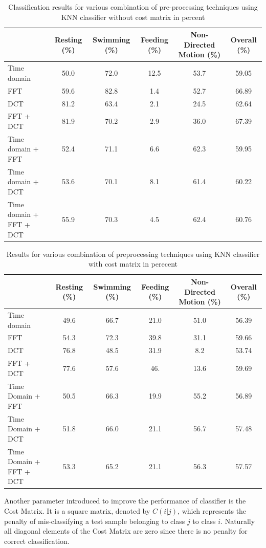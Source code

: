 \documentclass[conference]{IEEEtran}
\begin{document}
\begin{table}[h]
	\centering
	\caption{Classification results for various combination of pre-processing techniques using KNN classifier without cost matrix in percent}
	\begin{tabular}{l c c c c c}
	\hline
	& \textbf{Resting} (\%) & \textbf{Swimming}  (\%) & \textbf{Feeding}  (\%) & \textbf{Non-Directed Motion}  (\%) & \textbf{Overall}  (\%) \\
	\hline
	Time domain & 50.0&	72.0&	12.5&	53.7&	59.05\\
     FFT & 59.6&	82.8&	1.4&	52.7&	66.89\\
     DCT & 81.2&	63.4&	2.1&	24.5&	62.64 \\
   FFT + DCT & 81.9&	70.2&	2.9&	36.0& 	67.39\\
	Time domain + FFT & 52.4& 	71.1&	6.6&	62.3&	59.95 \\
	Time domain + DCT & 53.6& 	70.1&	8.1&	61.4&	60.22\\
	Time domain + FFT + DCT & 55.9&	70.3&	4.5&	62.4&	60.76 \\
	\hline
	\end{tabular}
	\label{without cost matrix}
\end{table}

\begin{table}[h]
	\centering
	\caption{Results for various combination of preprocessing techniques using KNN classifier with cost matrix in perecent}
	\begin{tabular}{l c c c c c}
	\hline
	& \textbf{Resting} (\%) & \textbf{Swimming}  (\%) & \textbf{Feeding}  (\%) & \textbf{Non-Directed Motion}  (\%) & \textbf{Overall}  (\%) \\
	\hline
	Time domain & 49.6	&66.7&	21.0&	51.0&	56.39\\
     FFT & 54.3&	72.3&	39.8&	31.1&	59.66\\
     DCT & 76.8&	48.5&	31.9&	8.2&	53.74\\
   FFT + DCT & 77.6&	57.6&	46.&	13.6&	59.69\\
	Time Domain + FFT & 50.5&	66.3&	19.9&	55.2&	56.89\\
	Time Domain + DCT & 51.8&	66.0&	21.1&	56.7&	57.48\\
	Time Domain + FFT + DCT & 53.3&	65.2&	21.1&	56.3&	57.57\\
	\hline
	\end{tabular}
	\label{without cost matrix}
\end{table}

Another parameter introduced to improve the performance of classifier is the Cost Matrix. It is a square matrix, denoted by $C(i|j)$, which represents the penalty of mis-classifying a test sample belonging to class $j$ to class $i$.  Naturally all diagonal elements of the Cost Matrix are zero since there is no penalty for correct classification. 
\end{document}
